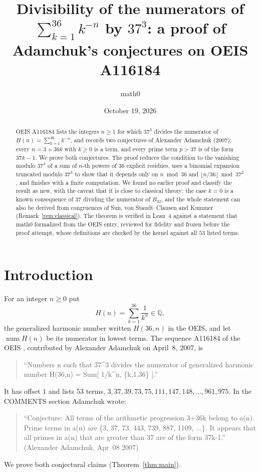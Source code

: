 \documentclass[11pt]{amsart}
\title[Adamchuk's conjectures for OEIS A116184]{Divisibility of the numerators of $\sum_{k=1}^{36}k^{-n}$ by $37^3$: a proof of Adamchuk's conjectures on OEIS A116184}
\author{math0}
\date{October 19, 2026}
\theoremstyle{plain}
\theoremstyle{definition}
\newcommand{\Q}{\mathbb{Q}}
\DeclareMathOperator{\num}{num}
\begin{document}
\begin{abstract}
OEIS A116184 lists the integers $n\ge1$ for which $37^3$ divides the numerator of $H(n)=\sum_{k=1}^{36}k^{-n}$, and records two conjectures of Alexander Adamchuk (2007): every $n=3+36k$ with $k\ge0$ is a term, and every prime term $p>37$ is of the form $37k-1$. We prove both conjectures. The proof reduces the condition to the vanishing modulo $37^3$ of a sum of $n$-th powers of $36$ explicit residues, uses a binomial expansion truncated modulo $37^3$ to show that it depends only on $n\bmod 36$ and $\lfloor n/36\rfloor\bmod 37^2$, and finishes with a finite computation. We found no earlier proof and classify the result as new, with the caveat that it is close to classical theory: the case $k=0$ is a known consequence of $37$ dividing the numerator of $B_{32}$, and the whole statement can also be derived from congruences of Sun, von Staudt--Clausen and Kummer (Remark~\ref{rem:classical}). The theorem is verified in Lean~4 against a statement that math0 formalized from the OEIS entry, reviewed for fidelity and frozen before the proof attempt, whose definitions are checked by the kernel against all $53$ listed terms.
\end{abstract}
\maketitle

\section{Introduction}

For an integer $n\ge0$ put
\[
  H(n)=\sum_{k=1}^{36}\frac1{k^n}\in\Q ,
\]
the generalized harmonic number written $H(36,n)$ in the OEIS, and let $\num H(n)$ be its numerator in lowest terms. The sequence A116184 of the OEIS \cite{A116184}, contributed by Alexander Adamchuk on April~8, 2007, is
\begin{quote}
``Numbers n such that 37\^{}3 divides the numerator of generalized harmonic number H(36,n) = Sum[ 1/k\^{}n, \{k,1,36\} ].''
\end{quote}
It has offset $1$ and lists $53$ terms, $3,37,39,73,75,111,147,148,\dots,961,975$. In the COMMENTS section Adamchuk wrote:
\begin{quote}
``Conjecture: All terms of the arithmetic progression 3+36k belong to a(n). Prime terms in a(n) are \{3, 37, 73, 443, 739, 887, 1109, ...\}. It appears that all primes in a(n) that are greater than 37 are of the form 37k-1.'' (Alexander Adamchuk, Apr~08 2007)
\end{quote}
We prove both conjectural claims (Theorem~\ref{thm:main}).
\end{document}
